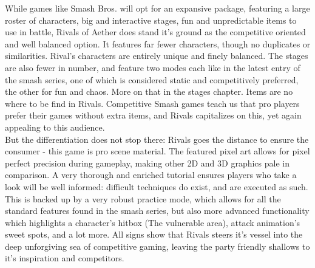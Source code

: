 \documentclass{article}
\begin{document}
While games like Smash Bros. will opt for an expansive package, featuring a large roster of characters, big and interactive stages, fun and unpredictable items to use in battle, Rivals of Aether does stand it's ground as the competitive oriented and well balanced option. It features far fewer characters, though no duplicates or similarities. Rival's characters are entirely unique and finely balanced. The stages are also fewer in number, and feature two modes each like in the latest entry of the smash series, one of which is considered static and competitively preferred, the other for fun and chaos. More on that in the stages chapter. Items are no where to be find in Rivals. Competitive Smash games teach us that pro players prefer their games without extra items, and Rivals capitalizes on this, yet again appealing to this audience.\\
But the differentiation does not stop there: Rivals goes the distance to ensure the consumer - this game is pro scene material. The featured pixel art allows for pixel perfect precision during gameplay, making other 2D and 3D graphics pale in comparison. A very thorough and enriched tutorial ensures players who take a look will be well informed: difficult techniques do exist, and are executed as such. This is backed up by a very robust practice mode, which allows for all the standard features found in the smash series, but also more advanced functionality which highlights a character's hitbox (The vulnerable area), attack animation's sweet spots, and a lot more. All signs show that Rivals steers it's vessel into the deep unforgiving sea of competitive gaming, leaving the party friendly shallows to it's inspiration and competitors.\\



\newpage
\end{document}
